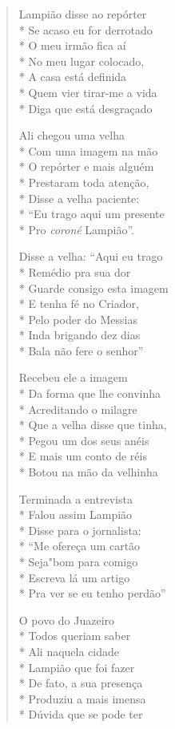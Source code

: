 \begin{verse}
Lampião disse ao repórter\\*
Se acaso eu for derrotado\\*
O meu irmão fica aí\\*
No meu lugar colocado,\\*
A casa está definida\\*
Quem vier tirar-me a vida\\*
Diga que está desgraçado

Ali chegou uma velha\\*
Com uma imagem na mão\\*
O repórter e mais alguém\\*
Prestaram toda atenção,\\*
Disse a velha paciente:\\*
``Eu trago aqui um presente\\*
Pro \textit{coroné} Lampião''.

Disse a velha: ``Aqui eu trago\\*
Remédio pra sua dor\\*
Guarde consigo esta imagem\\*
E tenha fé no Criador,\\*
Pelo poder do Messias\\*
Inda brigando dez dias\\*
Bala não fere o senhor''

Recebeu ele a imagem\\*
Da forma que lhe convinha\\*
Acreditando o milagre\\*
Que a velha disse que tinha,\\*
Pegou um dos seus anéis\\*
E mais um conto de réis\\*
Botou na mão da velhinha

Terminada a entrevista\\*
Falou assim Lampião\\*
Disse para o jornalista:\\*
``Me ofereça um cartão\\*
Seja"bom para comigo\\*
Escreva lá um artigo\\*
Pra ver se eu tenho perdão''

O povo do Juazeiro\\*
Todos queriam saber\\*
Ali naquela cidade\\*
Lampião que foi fazer\\*
De fato, a sua presença\\*
Produziu a mais imensa\\*
Dúvida que se pode ter


\end{verse}
